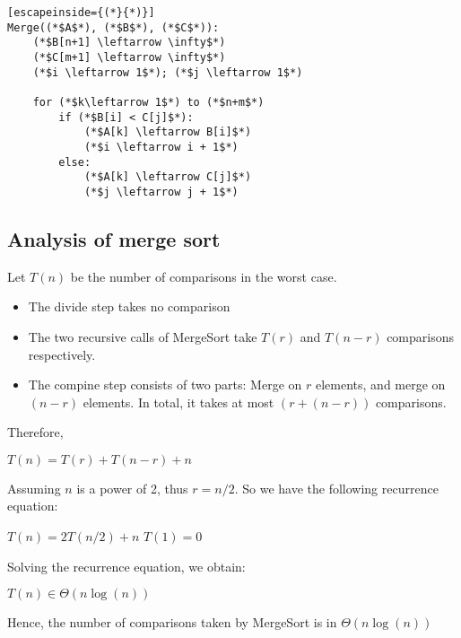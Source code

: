 \documentclass[a4paper]{article}
\begin{document}
\begin{lstlisting}[escapeinside={(*}{*)}]
Merge((*$A$*), (*$B$*), (*$C$*)):
	(*$B[n+1] \leftarrow \infty$*)
	(*$C[m+1] \leftarrow \infty$*)
	(*$i \leftarrow 1$*); (*$j \leftarrow 1$*)
	
	for (*$k\leftarrow 1$*) to (*$n+m$*)
		if (*$B[i] < C[j]$*):
			(*$A[k] \leftarrow B[i]$*)
			(*$i \leftarrow i + 1$*)
		else:
			(*$A[k] \leftarrow C[j]$*)
			(*$j \leftarrow j + 1$*)
\end{lstlisting}
\subsection{Analysis of merge sort}
Let $T(n)$ be the number of comparisons in the worst case.
\begin{itemize}
	\item The divide step takes no comparison
	\item The two recursive calls of MergeSort take $T(r)$ and $T(n-r)$ comparisons respectively.
	\item The compine step consists of two parts: Merge on $r$ elements, and merge on $(n-r)$ elements. In total, it takes at most $(r+(n-r))$ comparisons.
\end{itemize}
Therefore,
\begin{center}
	$T(n) = T(r) + T(n-r) + n$
\end{center}
Assuming $n$ is a power of 2, thus $r=n/2$. So we have the following recurrence equation:
\begin{center}
	$T(n) = 2T(n/2) + n$
	$T(1) = 0$
\end{center}
Solving the recurrence equation, we obtain:
\begin{center}
	$T(n) \in \Theta(n \log(n))$
\end{center}
Hence, the number of comparisons taken by MergeSort is in $\Theta(n \log(n))$
\end{document}
